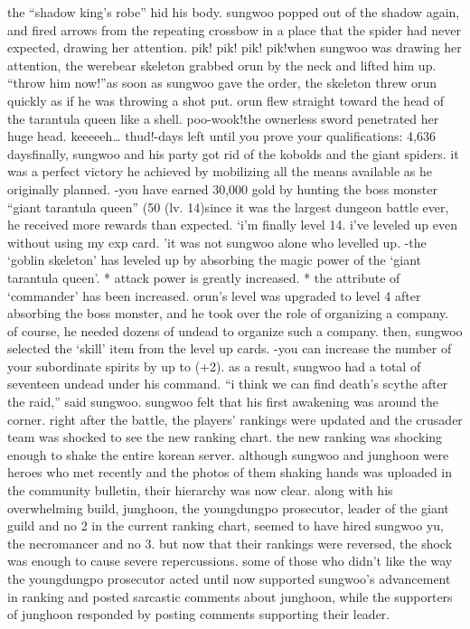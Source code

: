 the “shadow king’s robe” hid his body.
 sungwoo popped out of the shadow again, and fired arrows from the repeating crossbow in a place that the spider had never expected, drawing her attention.
pik! pik! pik! pik!when sungwoo was drawing her attention, the werebear skeleton grabbed orun by the neck and lifted him up.
“throw him now!”as soon as sungwoo gave the order, the skeleton threw orun quickly as if he was throwing a shot put.
 orun flew straight toward the head of the tarantula queen like a shell.
poo-wook!the ownerless sword penetrated her huge head.
keeeeeh… thud!-days left until you prove your qualifications: 4,636 daysfinally, sungwoo and his party got rid of the kobolds and the giant spiders.
it was a perfect victory he achieved by mobilizing all the means available as he originally planned.
-you have earned 30,000 gold by hunting the boss monster “giant tarantula queen” (50%
 (lv.
 14)since it was the largest dungeon battle ever, he received more rewards than expected.
‘i’m finally level 14.
 i’ve leveled up even without using my exp card.
’it was not sungwoo alone who levelled up.
-the ‘goblin skeleton’ has leveled up by absorbing the magic power of the ‘giant tarantula queen’.
* attack power is greatly increased.
* the attribute of ‘commander’ has been increased.
orun’s level was upgraded to level 4 after absorbing the boss monster, and he took over the role of organizing a company.
of course, he needed dozens of undead to organize such a company.
then, sungwoo selected the ‘skill’ item from the level up cards.
-you can increase the number of your subordinate spirits by up to (+2).
as a result, sungwoo had a total of seventeen undead under his command.
“i think we can find death’s scythe after the raid,” said sungwoo.
sungwoo felt that his first awakening was around the corner.
right after the battle, the players’ rankings were updated and the crusader team was shocked to see the new ranking chart.
 the new ranking was shocking enough to shake the entire korean server.
although sungwoo and junghoon were heroes who met recently and the photos of them shaking hands was uploaded in the community bulletin, their hierarchy was now clear.
along with his overwhelming build, junghoon, the youngdungpo prosecutor, leader of the giant guild and no 2 in the current ranking chart, seemed to have hired sungwoo yu, the necromancer and no 3.
but now that their rankings were reversed, the shock was enough to cause severe repercussions.
some of those who didn’t like the way the youngdungpo prosecutor acted until now supported sungwoo’s advancement in ranking and posted sarcastic comments about junghoon, while the supporters of junghoon responded by posting comments supporting their leader.
